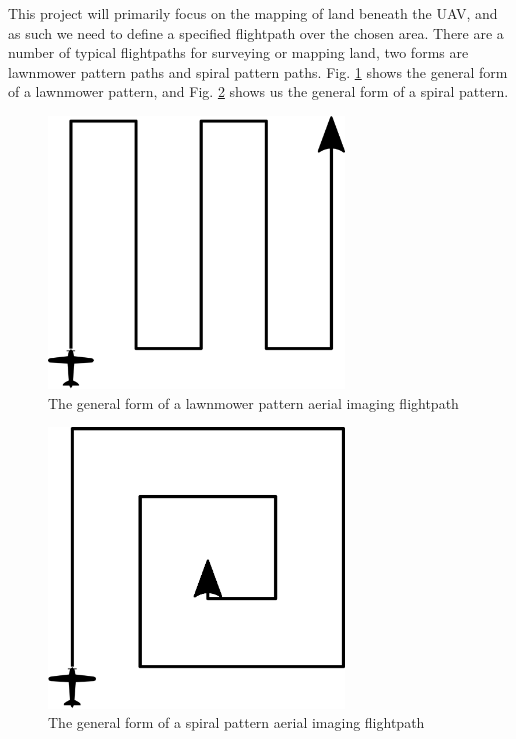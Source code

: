 This project will primarily focus on the mapping of land beneath the UAV, and as such we need to define a specified flightpath over the chosen area. There are a number of typical flightpaths for surveying or mapping land, two forms are lawnmower pattern paths and spiral pattern paths. Fig. \ref{fig:simplelawnmower} shows the general form of a lawnmower pattern, and Fig. \ref{fig:simplespiral} shows us the general form of a spiral pattern.

\begin{figure}[htbp!] 
\centering    
\includegraphics[width=0.7\textwidth]{SimpleLawnmower}
\caption[Simple Lawnmower Pattern]{The general form of a lawnmower pattern aerial imaging flightpath}
\label{fig:simplelawnmower}
\end{figure}

\begin{figure}[htbp!] 
\centering    
\includegraphics[width=0.7\textwidth]{SimpleSpiral}
\caption[Simple Spiral Pattern]{The general form of a spiral pattern aerial imaging flightpath}
\label{fig:simplespiral}
\end{figure}

